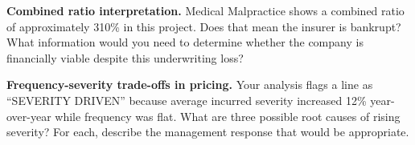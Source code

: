 \begin{interviewbox}
\textbf{Combined ratio interpretation.}
Medical Malpractice shows a combined ratio of approximately 310\% in this
project.  Does that mean the insurer is bankrupt?  What information would
you need to determine whether the company is financially viable despite
this underwriting loss?
\end{interviewbox}

\begin{interviewbox}
\textbf{Frequency-severity trade-offs in pricing.}
Your analysis flags a line as ``SEVERITY DRIVEN'' because average incurred
severity increased 12\% year-over-year while frequency was flat.  What are
three possible root causes of rising severity?  For each, describe the
management response that would be appropriate.
\end{interviewbox}
